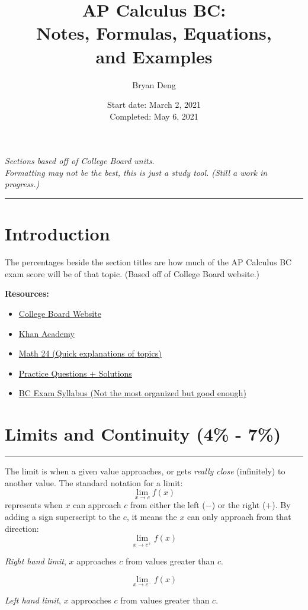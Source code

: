 \documentclass[12pt]{article}
\title{\textbf{AP Calculus BC:\\Notes, Formulas,  Equations,\\and Examples}}
\author{Bryan Deng}
\date{Start date: March 2, 2021\\Completed: May 6, 2021}
\newcommand{\fline}{\par\noindent\rule{\textwidth}{0.1pt}} %
\begin{document}
\maketitle
\vfill
\begin{center}
    \textit{Sections based off of College Board units.\\
        Formatting may not be the best, this is just a study tool. (Still a work in progress.)}
\end{center}
\newpage

\tableofcontents
\fline
\newpage

\section*{Introduction}
\indent The percentages beside the section titles are how much of the AP Calculus BC exam score will be of that topic. (Based off of College Board website.)

\noindent \textbf{Resources:}
\begin{itemize}
    \item \href{https://apstudents.collegeboard.org/courses/ap-calculus-bc}{College Board Website}
    \item \href{https://www.khanacademy.org/math/ap-calculus-bc}{Khan Academy}
    \item \href{https://www.math24.net/topics-calculus}{Math 24 (Quick explanations of topics)}
    \item \href{https://www.math.ucdavis.edu/~kouba/CalcOneDIRECTORY/}{Practice Questions + Solutions}
    \item \href{https://www.chelmsford.k12.ma.us/site/handlers/filedownload.ashx?moduleinstanceid=2496&dataid=7289&FileName=AP%20Calculus%20BC%20Syllabus.pdf}{BC Exam Syllabus (Not the most organized but good enough)}
\end{itemize}

\section{Limits and Continuity (4\% - 7\%)}
\fline

The limit is when a given value approaches, or gets \textit{really close} (infinitely) to another value. The standard notation for a limit:
\[ \lim_{x \to c} f(x) \]
represents when $x$ can approach $c$ from either the left ($-$) or the right ($+$). By adding a sign superscript to the $c$, it means the $x$ can only approach from that direction:
\[ \lim_{x \to c^+} f(x) \]
\begin{center}
    \textit{Right hand limit}, $x$ approaches $c$ from values greater than $c$.
\end{center}
\[ \lim_{x \to c^-} f(x) \]
\begin{center}
    \textit{Left hand limit}, $x$ approaches $c$ from values greater than $c$.
\end{center}
\end{document}
